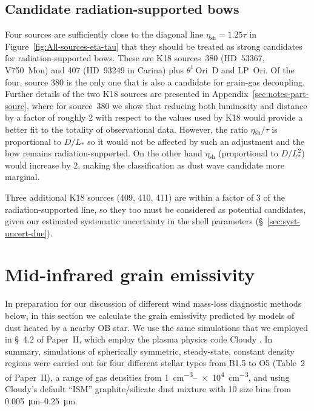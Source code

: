 \documentclass[useAMS, usenatbib, a4paper]{mnras}
\newcommand{\thD}{\(\theta^1\)\,Ori~D}
\newcommand\shell{\ensuremath{_{\text{sh}}}}
\newcommand\hii{\ion{H}{ii}}
\begin{document}
\subsection{Candidate radiation-supported bows}
\label{sec:cand-radi-supp}

Four sources are sufficiently close to the diagonal line
\(\eta\shell = 1.25 \tau\) in Figure~\ref{fig:All-sources-eta-tau}
that they should be treated as strong candidates for
radiation-supported bows. These are K18 sources~380 (HD~53367,
V750~Mon) and 407 (HD~93249 in Carina) plus \thD{} and LP~Ori.  Of the
four, source 380 is the only one that is also a candidate for
grain-gas decoupling.  Further details of the two K18 sources are
presented in Appendix~\ref{sec:notes-part-sourc}, where for source~380
we show that reducing both luminosity and distance by a factor of
roughly 2 with respect to the values used by K18 would provide a
better fit to the totality of observational data.  However, the ratio
\(\eta\shell /\tau\) is proportional to \(D / L_*\) so it would not be
affected by such an adjustment and the bow remains
radiation-supported.  On the other hand \(\eta\shell\) (proportional
to \(D / L_*^2\)) would increase by 2, making the classification as
dust wave candidate more marginal.

Three additional K18 sources (409, 410, 411) are within a factor of 3
of the radiation-supported line, so they too must be considered as
potential candidates, given our estimated systematic uncertainty in
the shell parameters (\S~\ref{sec:syst-uncert-due}).


\section{Mid-infrared grain emissivity}
\label{sec:grain-temp-emiss}

In preparation for our discussion of different wind mass-loss
diagnostic methods below, in this section we calculate the grain
emissivity predicted by models of dust heated by a nearby OB star.  We
use the same simulations that we employed in \S~4.2 of Paper~II,
which employ the plasma physics code Cloudy \citep{Ferland:2013a,
  Ferland:2017a}.  In summary, simulations of spherically symmetric,
steady-state, constant density \hii{} regions were carried out for
four different stellar types from B1.5 to O5 (Table~2 of Paper~II), a
range of gas densities from \SIrange{1}{e4}{cm^{-3}}, and using
Cloudy's default ``ISM'' graphite/silicate dust mixture with 10 size
bins from \SIrange{0.005}{0.25}{\um}.  
\end{document}

